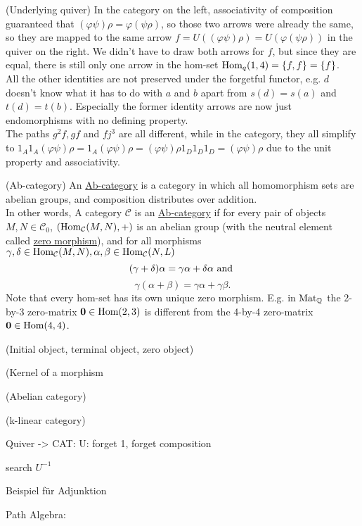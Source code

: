 \begin{example}{(Underlying quiver)}
\noindent In the category on the left, associativity of composition guaranteed that $(\varphi\psi)\rho = \varphi(\psi\rho)$, so those two arrows
were already the same, so they are mapped to the same arrow $f = U((\varphi\psi)\rho) = U(\varphi(\psi\rho))$ in the quiver on the right.
We didn't have to draw both arrows for $f$, but since they are equal, there is still only one arrow in the hom-set $\textup{Hom}_{q}(1,4)=\{f,f\} = \{f\}$.\\
All the other identities are not preserved under the forgetful functor, e.g. $d$ doesn't know what it has to do with $a$ and $b$ apart from
$s(d) = s(a)$ and $t(d) = t(b)$. Especially the former identity arrows are now just endomorphisms with no defining property.\\
The paths $g^{2}f, gf$ and $fj^{3}$ are all different, while in the category, they all simplify to
$1_{A}1_{A}(\varphi\psi)\rho = 1_{A}(\varphi\psi)\rho = (\varphi\psi)\rho1_{D}1_{D}1_{D} =  (\varphi\psi)\rho$ due to the unit property and associativity.
\end{example}


\begin{definition}{(Ab-category)}
An \ul{Ab-category} is a category in which all homomorphism sets are abelian groups, and composition distributes over addition.\\
In other words,
A category $\mathcal{C}$ is an \ul{Ab-category} if for every pair of objects $M,N \in \mathcal{C}_{0}$, $( \textup{Hom}_{\mathcal{C}}(M,N), + )$ is
an abelian group (with the neutral element called \ul{zero morphism}), and for all morphisms $\gamma, \delta \in \textup{Hom}_{\mathcal{C}}(M,N),
\alpha, \beta \in \textup{Hom}_{\mathcal{C}}(N,L)$
\[
(\gamma + \delta)\alpha = \gamma\alpha + \delta\alpha \textup{ and }\]\[
\gamma(\alpha+\beta) = \gamma\alpha + \gamma\beta.
\]
Note that every hom-set has its own unique zero morphism. E.g. in $\textup{Mat}_{\mathbb{Q}}$ the 2-by-3 zero-matrix $\mathbf{0} \in \textup{Hom}(2,3)$ is different from
the 4-by-4 zero-matrix $\mathbf{0} \in \textup{Hom}(4,4)$.
\end{definition}

\begin{definition}{(Initial object, terminal object, zero object)}

\end{definition}

\begin{example}{}

\end{example}

\begin{definition}{(Kernel of a morphism}

\end{definition}

\begin{definition}{(Abelian category)}

\end{definition}
\begin{definition}{(k-linear category)}

\end{definition}


Quiver -> CAT: U: forget 1, forget composition

search $U^{-1}$

Beispiel für Adjunktion


Path Algebra: